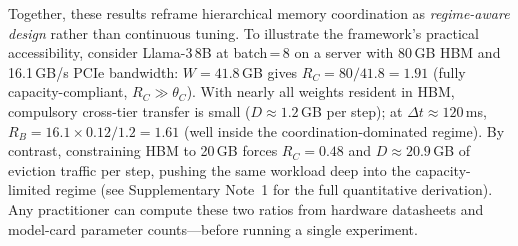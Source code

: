 Together, these results reframe hierarchical memory coordination as
\emph{regime-aware design} rather than continuous tuning.
To illustrate the framework's practical accessibility, consider Llama-3\,8B at
batch\,=\,8 on a server with 80\,GB HBM and 16.1\,GB/s PCIe bandwidth:
$W = 41.8$\,GB gives $R_C = 80/41.8 = 1.91$ (fully capacity-compliant,
$R_C \gg \theta_C$).
With nearly all weights resident in HBM, compulsory cross-tier transfer is
small ($D \approx 1.2$\,GB per step); at $\Delta t \approx 120$\,ms,
$R_B = 16.1 \times 0.12 / 1.2 = 1.61$ (well inside the coordination-dominated
regime).
By contrast, constraining HBM to 20\,GB forces $R_C = 0.48$ and
$D \approx 20.9$\,GB of eviction traffic per step, pushing the same workload
deep into the capacity-limited regime (see Supplementary Note~1 for the
full quantitative derivation).
Any practitioner can compute these two ratios from hardware datasheets and
model-card parameter counts---before running a single experiment.

\FloatBarrier
